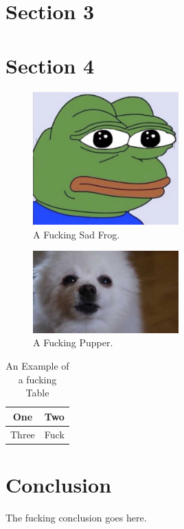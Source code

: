 \documentclass[journal,transmag]{IEEEtran}
\begin{document}
\section{Section 3}
	\lipsum[6-8]
	
\section{Section 4}
	\lipsum[9-10]
	
\begin{figure}[!t]
	\centering
	\includegraphics[width= 0.5\textwidth]{IMAGES/exampleImage}
	\caption{A Fucking Sad Frog.}
	\label{fig_frog}
\end{figure}

\begin{figure}[!t]
	\centering
	\includegraphics[width= 0.5\textwidth]{IMAGES/fig2}
	\caption{A Fucking Pupper.}
	\label{fig_pup}
\end{figure}

\begin{table}[!t]
	\renewcommand{\arraystretch}{1.3}
	\caption{An Example of a fucking Table}
	\label{table_example}
	\centering
	\begin{tabular}{|c|c|}
		\hline
		One & Two\\
		\hline
		Three & Fuck\\
		\hline
	\end{tabular}
\end{table}

\section{Conclusion}
The fucking conclusion goes here.
\end{document}
